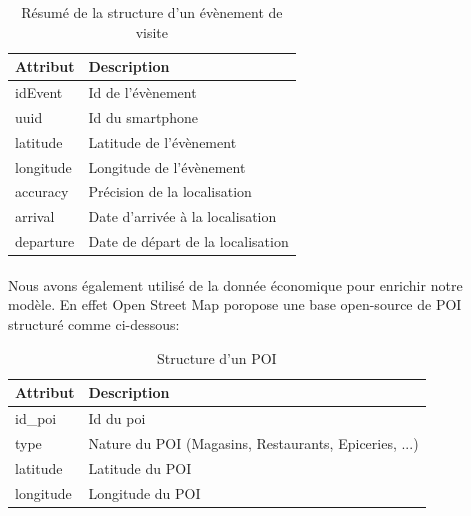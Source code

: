 \begin{table}[H]
    \centering
    \begin{tabular}{|l|l|}
    \hline
    \textbf{Attribut} & \textbf{Description}              \\ \hline
    idEvent           & Id de l'évènement                 \\ \hline
    uuid              & Id du smartphone                  \\ \hline
    latitude          & Latitude de l'évènement           \\ \hline
    longitude         & Longitude de l'évènement          \\ \hline
    accuracy          & Précision de la localisation      \\ \hline
    arrival           & Date d'arrivée à la localisation  \\ \hline
    departure         & Date de départ de la localisation \\ \hline
    \end{tabular}
    \caption{Résumé de la structure d'un évènement de visite}
\end{table}

\paragraph*{}

Nous avons également utilisé de la donnée économique pour enrichir notre modèle. En effet Open Street Map poropose une base open-source de POI structuré comme ci-dessous:

\begin{table}[H]
    \centering
    \begin{tabular}{|l|l|}
    \hline
    \textbf{Attribut} & \textbf{Description}                                  \\ \hline
    id\_poi           & Id du poi                                             \\ \hline
    type              & Nature du POI (Magasins, Restaurants, Epiceries, ...) \\ \hline
    latitude          & Latitude du POI                                       \\ \hline
    longitude         & Longitude du POI                                      \\ \hline
    \end{tabular}
    \caption{Structure d'un POI}
\end{table}

